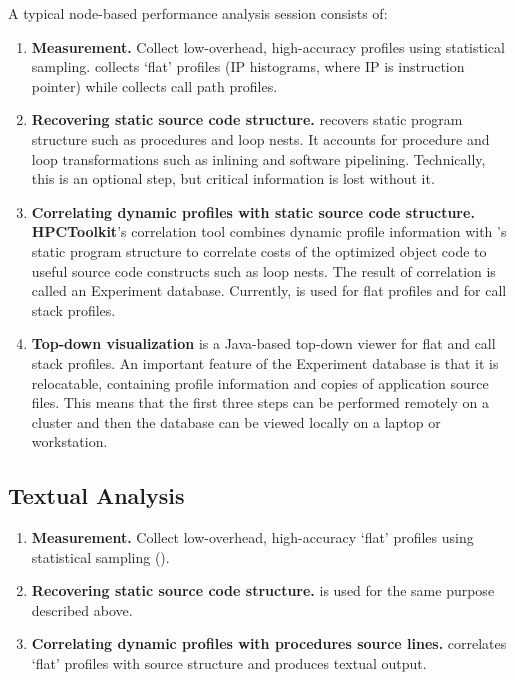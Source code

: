 \documentclass[english]{article}
\begin{document}
A typical node-based performance analysis session consists of:
\begin{enumerate}
\item \textbf{Measurement.}  
Collect low-overhead, high-accuracy profiles using statistical sampling.
 collects `flat' profiles (IP histograms, where IP is instruction pointer) while  collects call path profiles.

\item \textbf{Recovering static source code structure.} 
 recovers static program structure such as procedures and loop nests.
It accounts for procedure and loop transformations such as inlining and software pipelining.
Technically, this is an optional step, but critical information is lost without it.

\item \textbf{Correlating dynamic profiles with static source code structure.} 
\textbf{HPCToolkit}'s correlation tool combines dynamic profile information with 's static program structure to correlate costs of the optimized object code to useful source code constructs such as loop nests.
The result of correlation is called an Experiment database.
Currently,  is used for flat profiles and  for call stack profiles.

\item \textbf{Top-down visualization}
 is a Java-based top-down viewer for flat and call stack profiles.
An important feature of the Experiment database is that it is relocatable, containing profile information and copies of application source files.
This means that the first three steps can be performed remotely on a cluster and then the database can be viewed locally on a laptop or workstation.
\end{enumerate}

\subsection{Textual Analysis}

\begin{enumerate}
\item \textbf{Measurement.}  
Collect low-overhead, high-accuracy `flat' profiles using statistical sampling ().

\item \textbf{Recovering static source code structure.} 
 is used for the same purpose described above.

\item \textbf{Correlating dynamic profiles with procedures source lines.} 
 correlates `flat' profiles with source structure and produces textual output.

\end{enumerate}
\end{document}
